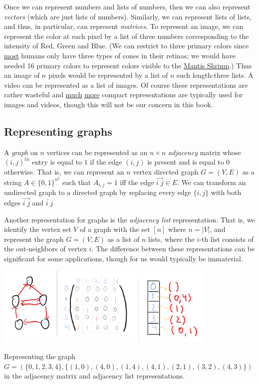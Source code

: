 Once we can represent numbers and lists of numbers, then we can also
represent \emph{vectors} (which are just lists of numbers). Similarly,
we can represent lists of lists, and thus, in particular, can represent
\emph{matrices}. To represent an image, we can represent the color at
each pixel by a list of three numbers corresponding to the intensity of
Red, Green and Blue. (We can restrict to three primary colors since
\href{https://en.wikipedia.org/wiki/Tetrachromacy}{most} humans only
have three types of cones in their retinas; we would have needed 16
primary colors to represent colors visible to the
\href{https://goo.gl/t7JBfC}{Mantis Shrimp}.) Thus an image of \(n\)
pixels would be represented by a list of \(n\) such length-three lists.
A video can be represented as a list of images. Of course these
representations are rather wasteful and
\href{https://en.wikipedia.org/wiki/JPEG}{much}
\href{https://goo.gl/Vs8UhU}{more} compact representations are typically
used for images and videos, though this will not be our concern in this
book.

\subsection{Representing graphs}\label{Representing-graphs}

A \emph{graph} on \(n\) vertices can be represented as an \(n\times n\)
\emph{adjacency} matrix whose \((i,j)^{th}\) entry is equal to \(1\) if
the edge \((i,j)\) is present and is equal to \(0\) otherwise. That is,
we can represent an \(n\) vertex directed graph \(G=(V,E)\) as a string
\(A\in \{0,1\}^{n^2}\) such that \(A_{i,j}=1\) iff the edge
\(\overrightarrow{i\;j}\in E\). We can transform an undirected graph to
a directed graph by replacing every edge \(\{i,j\}\) with both edges
\(\overrightarrow{i\; j}\) and \(\overleftarrow{i\;j}\)

Another representation for graphs is the \emph{adjacency list}
representation. That is, we identify the vertex set \(V\) of a graph
with the set \([n]\) where \(n=|V|\), and represent the graph
\(G=(V,E)\) as a list of \(n\) lists, where the \(i\)-th list consists
of the out-neighbors of vertex \(i\). The difference between these
representations can be significant for some applications, though for us
would typically be immaterial.


\begin{marginfigure}
\centering
\includegraphics[width=\linewidth, height=1.5in, keepaspectratio]{../figure/representing_graphs.png}
\caption{Representing the graph
\(G=(\{0,1,2,3,4\},\{ (1,0),(4,0),(1,4),(4,1),(2,1),(3,2),(4,3) \})\) in
the adjacency matrix and adjacency list representations.}
\label{representinggraphsfig}
\end{marginfigure}

